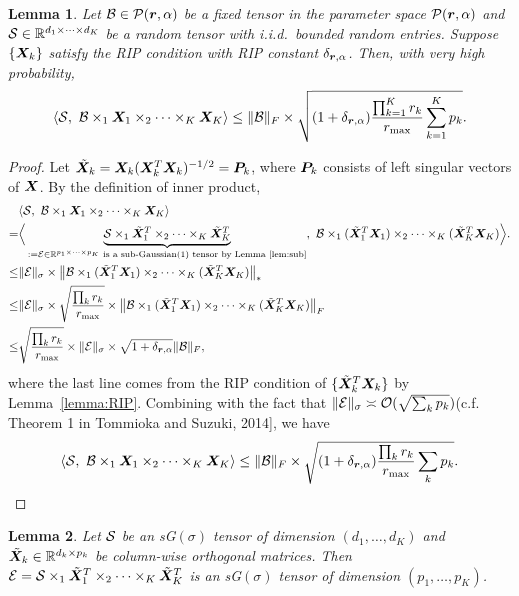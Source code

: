 \documentclass[11pt]{article}
\theoremstyle{plain}
\newtheorem{lem}{Lemma}
\theoremstyle{definition}
\newcommand*{\KeepStyleUnderBrace}[1]{%
  \mathop{%
    \mathchoice
    {\underbrace{\displaystyle#1}}%
    {\underbrace{\textstyle#1}}%
    {\underbrace{\scriptstyle#1}}%
    {\underbrace{\scriptscriptstyle#1}}%
  }\limits
}
\begin{document}
\begin{lem}\label{lem}
Let $\mathcal{B}\in\mathcal{P}(\bm{r},\alpha)$ be a fixed tensor in the parameter space $\mathcal{P}(\bm{r}, \alpha)$ and $\mathcal{S}\in\mathbb{R}^{d_1\times \cdots \times d_K}$ be a random tensor with i.i.d.\ bounded random entries. Suppose $\{\bm X_k\}$ satisfy the RIP condition with RIP constant $\delta_{\bm{r}, \alpha}$. Then, with very high probability,
\[
\langle \mathcal{S},\ \mathcal{B}\times_1\bm X_1\times_2\cdots\times_K\bm X_K \rangle \leq \lVert\mathcal{B}\rVert_F \times\sqrt{ (1+\delta_{\bm{r},\alpha}) {\prod_{k=1}^Kr_k \over r_{\max}}\sum_{k=1}^K p_k}.
\]
\end{lem}
\begin{proof}
Let $\tilde {\bm X}_k=\bm X_k(\bm X_k^T\bm X_k)^{-1/2}=\bm{P}_k$, where $\bm{P}_k$ consists of left singular vectors of $\bm X$. By the definition of inner product, 
\begin{align}
&\langle \tS,\ \tB\times_1\mX_1\times_2\cdots\times_K\mX_K \rangle\\
=& \Big\langle \KeepStyleUnderBrace{\tS\times_1\tilde \mX^T_1\times_2\cdots \times_K\tilde \mX^T_K}_{:=\tE\in\mathbb{R}^{p_1\times \cdots\times p_K}\text{ is a sub-Gaussian(1) tensor by Lemma~\ref{lem:sub}}} ,\ \tB\times_1(\tilde \mX^T_1\mX_1)\times_2 \cdots \times_K (\tilde \mX^T_K\mX_K)\Big \rangle.\\
\leq & \snormSize{}{\tE} \times \nnorm{\tB\times_1(\tilde \mX^T_1\mX_1)\times_2 \cdots \times_K (\tilde \mX^T_K\mX_K) } \\
\leq &    \snormSize{}{\tE} \times \sqrt{\prod_k r_k \over r_{\max}}\times \Fnorm{\tB \times_1 (\tilde \mX^T_1\mX_1)\times_2 \cdots \times_K (\tilde \mX^T_K\mX_K)   }\\
\leq & \sqrt{\prod_k r_k \over r_{\max}}\times  \snormSize{}{\tE}\times \sqrt{1+\delta_{\mr,\alpha}} \FnormSize{}{\tB},
\end{align}
where the last line comes from the RIP condition of $\{\tilde {\bm X}^T_k\bm X_k\}$ by Lemma~\ref{lemma:RIP}. Combining with the fact that $\lVert\mathcal{E}\rVert_\sigma\asymp \mathcal{O}( \sqrt{\sum_k p_k})$(c.f. Theorem 1 in Tommioka and Suzuki, 2014], we have 
\[
\langle \mathcal{S},\ \mathcal{B}\times_1\bm X_1\times_2\cdots\times_K\bm X_K \rangle\leq \lVert\mathcal{B}\rVert_F\times \sqrt{(1+\delta_{\bm{r},\alpha}){\prod_k r_k \over r_{\max}}\sum_k p_k}.
\] 
\end{proof}

\begin{lem} \label{lem:sub}
Let $\mathcal{S}$ be an sG$(\sigma)$ tensor of dimension $(d_1,\ldots,d_K)$ and $\tilde {\bm X}_k\in\mathbb{R}^{d_k\times p_k}$ be column-wise orthogonal matrices. Then $\mathcal{E}=\mathcal{S} \times_1 \tilde {\bm X}^T_1\times_2\cdots\times_K \tilde {\bm X}^T_K$ is an sG$(\sigma)$ tensor of dimension $(p_1,\ldots,p_K)$.
\end{lem}
\end{document}
